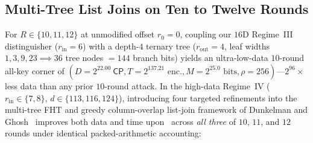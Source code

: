 \documentclass[11pt,a4paper]{article}
\theoremstyle{definition}
\theoremstyle{remark}
\newcommand{\CP}{\mathsf{CP}}
\begin{document}
\subsection{Multi-Tree List Joins on Ten to Twelve Rounds}
\label{subsec:depth4}
\label{subsec:10r-12r}

For $R \in \{10, 11, 12\}$ at unmodified offset $r_0 = 0$, coupling our $16$D Regime~III distinguisher ($r_{\text{in}} = 6$) with a depth-$4$ ternary tree ($r_{\text{out}} = 4$, leaf widths $1, 3, 9, 23 \implies 36$ tree nodes $= 144$ branch bits) yields an ultra-low-data $10$-round all-key corner of $(D = 2^{22.00}~\CP, T = 2^{137.21}\text{ enc.}, M = 2^{25.0}\text{ bits}, \rho = 256)$---$2^{96}\times$ less data than any prior $10$-round attack. In the high-data Regime~IV ($r_{\text{in}} \in \{7, 8\}$, $d \in \{113, 116, 124\}$), introducing four targeted refinements into the multi-tree FHT and greedy column-overlap list-join framework of Dunkelman and Ghosh~\cite{DG25} improves both data and time upon~\cite{DG25} across \emph{all three} of $10$, $11$, and $12$ rounds under identical packed-arithmetic accounting:
\end{document}
